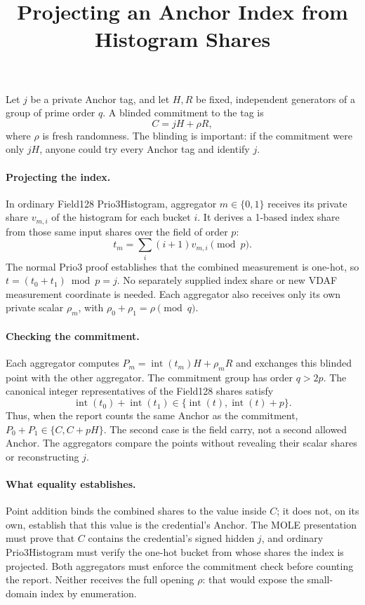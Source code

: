 \documentclass[11pt]{article}
\title{Projecting an Anchor Index from Histogram Shares}
\author{}
\date{}
\begin{document}
\maketitle

\noindent
Let $j$ be a private Anchor tag, and let $H,R$ be fixed, independent
generators of a group of prime order $q$. A blinded commitment to the tag is
\[
  C=jH+\rho R,
\]
where $\rho$ is fresh randomness. The blinding is important: if the
commitment were only $jH$, anyone could try every Anchor tag and identify
$j$.

\paragraph{Projecting the index.}
In ordinary Field128 Prio3Histogram, aggregator $m\in\{0,1\}$ receives its
private share $v_{m,i}$ of the histogram for each bucket $i$. It derives a
1-based index share from those same input shares over the field of order $p$:
\[
  t_m=\sum_i(i+1)v_{m,i}\pmod p.
\]
The normal Prio3 proof establishes that the combined measurement is one-hot,
so $t=(t_0+t_1)\bmod p=j$. No separately supplied index share or new VDAF
measurement coordinate is needed. Each aggregator also receives only its own
private scalar $\rho_m$, with $\rho_0+\rho_1=\rho\pmod q$.

\paragraph{Checking the commitment.}
Each aggregator computes $P_m=\operatorname{int}(t_m)H+\rho_mR$ and exchanges
this blinded point with the other aggregator. The commitment group has order
$q>2p$. The canonical integer representatives of the Field128 shares satisfy
\[
  \operatorname{int}(t_0)+\operatorname{int}(t_1)
   \in\{\operatorname{int}(t),\operatorname{int}(t)+p\}.
\]
Thus, when the report counts the same Anchor as the commitment,
$P_0+P_1\in\{C,C+pH\}$. The second case is the field carry, not a second
allowed Anchor. The aggregators compare the points without revealing their
scalar shares or reconstructing $j$.

\paragraph{What equality establishes.}
Point addition binds the combined shares to the value inside $C$; it does
not, on its own, establish that this value is the credential's Anchor.
The MOLE presentation must prove that $C$ contains the credential's signed
hidden $j$, and ordinary Prio3Histogram must verify the one-hot bucket from
whose shares the index is projected. Both aggregators must enforce the
commitment check before counting the report. Neither receives the full
opening $\rho$: that would expose the small-domain index by enumeration.
\end{document}
